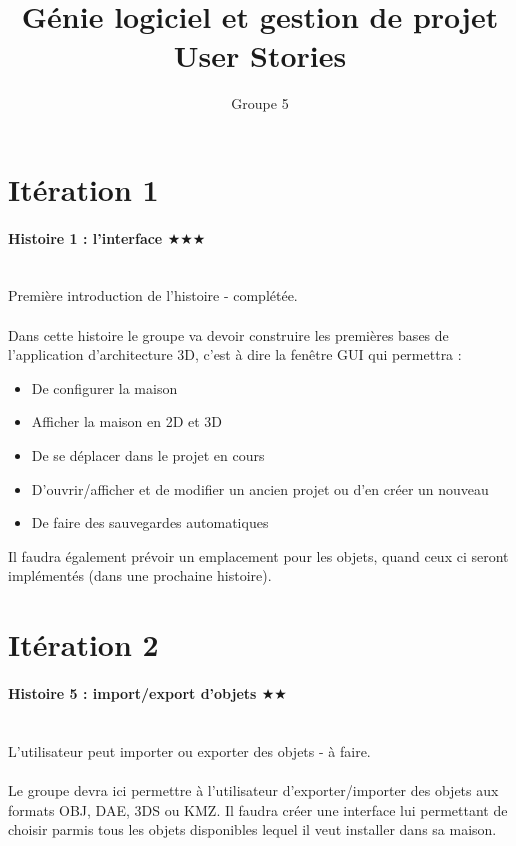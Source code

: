 \documentclass[12pt,a4paper]{article}
\title{Génie logiciel et gestion de projet \\ User Stories}
\author{Groupe 5}
\begin{document}
\maketitle

\newpage
\section{Itération 1}
	\paragraph{Histoire 1 : l'interface $\bigstar\bigstar\bigstar$\\\\}
		Première introduction de l'histoire - complétée.
		\\ \\
		Dans cette histoire le groupe va devoir construire les premières bases de l'application d'architecture 3D, c'est à dire la fenêtre GUI qui permettra :
		\begin{itemize}
			\item De configurer la maison
			\item Afficher la maison en 2D et 3D
			\item De se déplacer dans le projet en cours
			\item D'ouvrir/afficher et de modifier un ancien projet ou d'en créer un nouveau
			\item De faire des sauvegardes automatiques
		\end{itemize}
		Il faudra également prévoir un emplacement pour les objets, quand ceux ci seront implémentés (dans une prochaine histoire).
		
\section{Itération 2}
	\paragraph{Histoire 5 : import/export d'objets $\bigstar\bigstar$\\\\}
		L'utilisateur peut importer ou exporter des objets - à faire.
		\\ \\
		Le groupe devra ici permettre à l'utilisateur d'exporter/importer des objets aux formats OBJ, DAE, 3DS ou KMZ. Il faudra créer une interface lui permettant de choisir parmis tous les objets disponibles lequel il veut installer dans sa maison.
\end{document}
